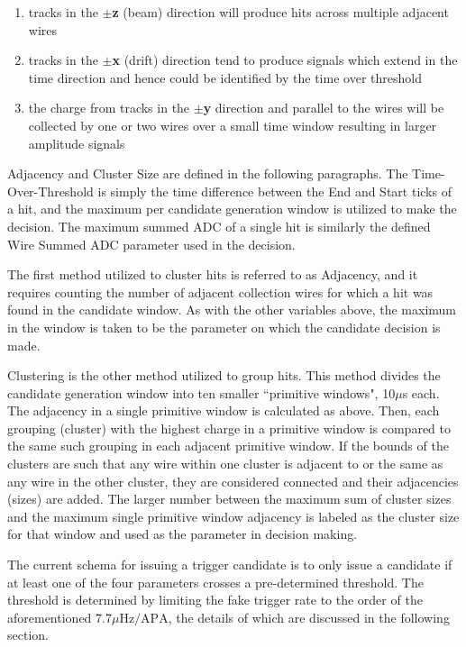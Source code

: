 \documentclass[11pt]{article}
\begin{document}
\begin{enumerate}
\setlength\itemsep{0em}
    \item tracks in the $\pm$\textbf{z} (beam) direction will produce hits across multiple adjacent wires
    \item tracks in the $\pm$\textbf{x} (drift) direction tend to produce signals which extend in the time direction and hence could be identified by the time over threshold
    \item the charge from tracks in the $\pm$\textbf{y} direction and parallel to the wires will be collected by one or two wires over a small time window resulting in larger amplitude signals
\end{enumerate}

Adjacency and Cluster Size are defined in the following paragraphs. The Time-Over-Threshold is simply the time difference between the End and Start ticks of a hit, and the maximum per candidate generation window is utilized to make the decision. The maximum summed ADC of a single hit is similarly the defined Wire Summed ADC parameter used in the decision.

The first method utilized to cluster hits is referred to as Adjacency, and it requires counting the number of adjacent collection wires for which a hit was found in the candidate window. As with the other variables above, the maximum in the window is taken to be the parameter on which the candidate decision is made.

Clustering is the other method utilized to group hits. This method divides the candidate generation window into ten smaller ``primitive windows", 10$\mu$s each. The adjacency in a single primitive window is calculated as above. Then, each grouping (cluster) with the highest charge in a primitive window is compared to the same such grouping in each adjacent primitive window. If the bounds of the clusters are such that any wire within one cluster is adjacent to or the same as any wire in the other cluster, they are considered connected and their adjacencies (sizes) are added. The larger number between the maximum sum of cluster sizes and the maximum single primitive window adjacency is labeled as the cluster size for that window and used as the parameter in decision making.

The current schema for issuing a trigger candidate is to only issue a candidate if at least one of the four parameters crosses a pre-determined threshold. The threshold is determined by limiting the fake trigger rate to the order of the aforementioned 7.7$\mu \text{Hz}/\text{APA}$, the details of which are discussed in the following section.
\end{document}
